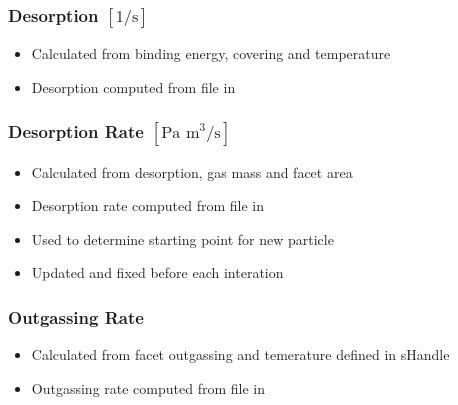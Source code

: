 \subsubsection{Desorption $[1/\text{s}]$}
\begin{itemize}[noitemsep,topsep=0pt]
\item Calculated from binding energy, covering and temperature
\item Desorption computed from  file in 
\end{itemize}

\subsubsection{Desorption Rate $[\text{Pa m}^3/\text{s}]$}
\begin{itemize}[noitemsep,topsep=0pt]
\item Calculated from desorption, gas mass and facet area
\item Desorption rate computed from  file in 
\item Used to determine starting point for new particle
\item Updated and fixed before each interation
\end{itemize}

\subsubsection{Outgassing Rate}
\begin{itemize}[noitemsep,topsep=0pt]
\item Calculated from facet outgassing and temerature defined in sHandle
\item Outgassing rate computed from  file in 
\end{itemize}

